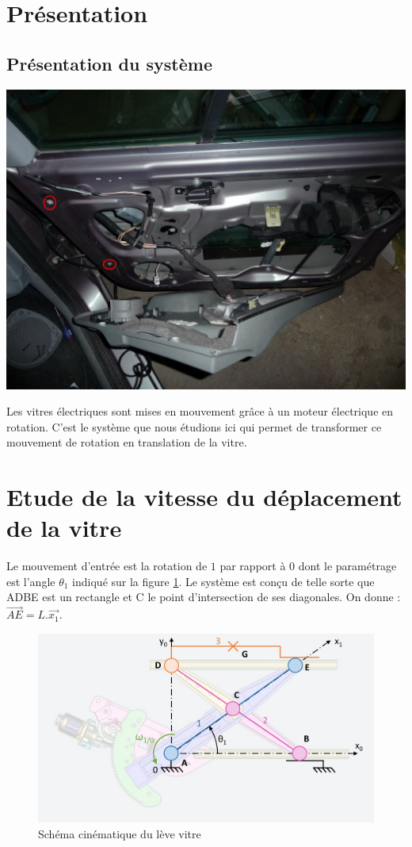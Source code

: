 

\section{Présentation}

\subsection{Présentation du système}

\begin{minipage}{0.48\linewidth}
 \centering\includegraphics[width=0.7\linewidth]{img/leve_vitre_auto}
\end{minipage}
\hfill
\begin{minipage}{0.48\linewidth}
Les vitres électriques sont mises en mouvement grâce à un moteur électrique en rotation. C'est le système que nous étudions ici qui permet de transformer ce mouvement de rotation en translation de la vitre.
\end{minipage}

\section{Etude de la vitesse du déplacement de la vitre}

Le mouvement d'entrée est la rotation de $1$ par rapport à $0$ dont le paramétrage est l'angle $\theta_1$ indiqué sur la figure \ref{fig01}. Le système est conçu de telle sorte que ADBE est un rectangle et C le point d'intersection de ses diagonales. On donne : $\overrightarrow{AE}=L.\overrightarrow{x_1}$.


\begin{figure}[ht!]
\begin{center}
 \includegraphics[width=0.7\linewidth]{img/leve_vitre}
\end{center}
\caption{\label{fig01} Schéma cinématique du lève vitre}
\end{figure}

